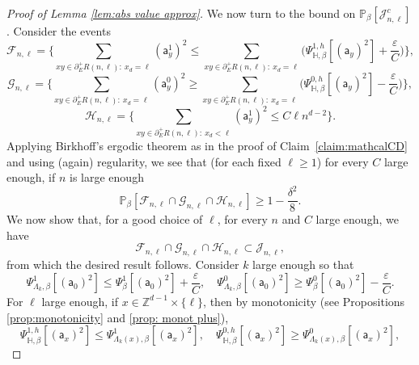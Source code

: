 \documentclass[11pt,a4paper]{article}
\numberwithin{equation}{section}
\theoremstyle{plain}
\theoremstyle{definition}
\begin{document}
\begin{proof}[Proof of Lemma \textup{\ref{lem:abs value approx}}]
We now turn to the bound on $\mathbb P_\beta [\mathcal J_{n,\ell}^c]$. Consider the events 
\begin{equation}
\mathcal F_{n,\ell}=\Big\{\sum_{xy\in \partial^+_E R(n,\ell): \: x_d=\ell}(\mathsf{a}^1_y)^2 \le \sum_{xy\in \partial^+_E R(n,\ell):\: x_d=\ell} \Big(\Psi^{1,h}_{\mathbb{H},\beta}[(\mathsf{a}_y)^2 ]+\frac{\varepsilon}{C}\Big)\Big\}, 
\end{equation}
\begin{equation}
\mathcal G_{n,\ell}=\Big\{\sum_{xy\in \partial^+_E R(n,\ell):\: x_d=\ell}(\mathsf{a}^0_y)^2 \ge \sum_{xy\in \partial^+_E R(n,\ell):\:x_d=\ell} \Big(\Psi^{0,h}_{\mathbb{H},\beta}[(\mathsf{a}_y)^2]-\frac{\varepsilon}{C}\Big)\Big\},
\end{equation}
\begin{equation}
\mathcal H_{n,\ell}=\Big\{\sum_{xy\in \partial^+_E R(n,\ell):\: x_d<\ell} (\mathsf{a}_y^1)^2\leq C\ell n^{d-2}\Big\}.
\end{equation}
Applying Birkhoff's ergodic theorem as in the proof of Claim~\ref{claim:mathcalCD} and using (again) regularity, we see that (for each fixed $\ell\geq 1$) for every $C$ large enough, if $n$ is large enough
\begin{equation}
\mathbb{P}_{\beta}[\mathcal F_{n,\ell}\cap \mathcal G_{n,\ell}\cap \mathcal H_{n,\ell}]\geq 1-\frac{\delta^2}{8}.
\end{equation}
We now show that, for a good choice of $\ell$, for every $n$ and $C$ large enough, we have
\begin{equation}\label{eq:inclusion}
\mathcal F_{n,\ell}\cap \mathcal G_{n,\ell}\cap \mathcal H_{n,\ell}\subset \mathcal J_{n,\ell},    
\end{equation}
from which the desired result follows.
Consider $k$ large enough so that
\begin{equation}
    \Psi^1_{\Lambda_k,\beta}[(\mathsf{a}_0)^2] \leq \Psi^1_\beta[(\mathsf{a}_0)^2] + \frac{\varepsilon}{C}, \quad \Psi^0_{\Lambda_k,\beta}[(\mathsf a_0)^2]\geq \Psi_\beta^0[(\mathsf{a}_0)^2]-\frac{\varepsilon}{C}.
\end{equation}
For $\ell$ large enough, if $x \in \mathbb Z^{d-1}\times \{\ell\}$, then by monotonicity (see Propositions \ref{prop:monotonicity} and \ref{prop: monot plus}),
\begin{equation}
\Psi^{1,h}_{\mathbb H,\beta}[(\mathsf a_x)^2] \leq \Psi^1_{\Lambda_k(x),\beta}[(\mathsf a_x)^2], \quad \Psi^{0,h}_{\mathbb H,\beta}[(\mathsf a_x)^2] \geq \Psi^0_{\Lambda_k(x),\beta}[(\mathsf a_x)^2],
\end{equation}

\end{proof}
\end{document}
